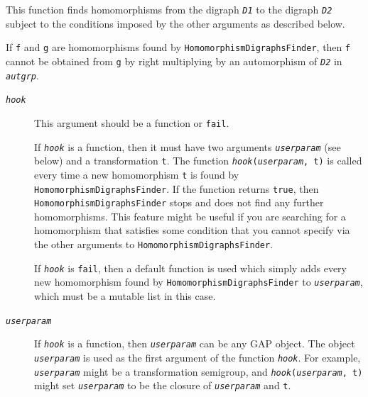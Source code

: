 \documentclass[a4paper,11pt]{report}
\begin{document}
{{{ This function finds homomorphisms from the digraph \mbox{\texttt{\mdseries\slshape D1}} to the digraph \mbox{\texttt{\mdseries\slshape D2}} subject to the conditions imposed by the other arguments as described below.

 If \texttt{f} and \texttt{g} are homomorphisms found by \texttt{HomomorphismDigraphsFinder}, then \texttt{f} cannot be obtained from \texttt{g} by right multiplying by an automorphism of \mbox{\texttt{\mdseries\slshape D2}} in \mbox{\texttt{\mdseries\slshape aut{\textunderscore}grp}}. 
\begin{description}
\item[{\mbox{\texttt{\mdseries\slshape hook}}}]  This argument should be a function or \texttt{fail}.

 If \mbox{\texttt{\mdseries\slshape hook}} is a function, then it must have two arguments \mbox{\texttt{\mdseries\slshape user{\textunderscore}param}} (see below) and a transformation \texttt{t}. The function \texttt{\mbox{\texttt{\mdseries\slshape hook}}(\mbox{\texttt{\mdseries\slshape user{\textunderscore}param}}, t)} is called every time a new homomorphism \texttt{t} is found by \texttt{HomomorphismDigraphsFinder}. If the function returns \texttt{true}, then \texttt{HomomorphismDigraphsFinder} stops and does not find any further homomorphisms. This feature might be
useful if you are searching for a homomorphism that satisfies some condition
that you cannot specify via the other arguments to \texttt{HomomorphismDigraphsFinder}. 

 If \mbox{\texttt{\mdseries\slshape hook}} is \texttt{fail}, then a default function is used which simply adds every new homomorphism
found by \texttt{HomomorphismDigraphsFinder} to \mbox{\texttt{\mdseries\slshape user{\textunderscore}param}}, which must be a mutable list in this case. 
\item[{\mbox{\texttt{\mdseries\slshape user{\textunderscore}param}}}]  If \mbox{\texttt{\mdseries\slshape hook}} is a function, then \mbox{\texttt{\mdseries\slshape user{\textunderscore}param}} can be any \textsf{GAP} object. The object \mbox{\texttt{\mdseries\slshape user{\textunderscore}param}} is used as the first argument of the function \mbox{\texttt{\mdseries\slshape hook}}. For example, \mbox{\texttt{\mdseries\slshape user{\textunderscore}param}} might be a transformation semigroup, and \texttt{\mbox{\texttt{\mdseries\slshape hook}}(\mbox{\texttt{\mdseries\slshape user{\textunderscore}param}}, t)} might set \mbox{\texttt{\mdseries\slshape user{\textunderscore}param}} to be the closure of \mbox{\texttt{\mdseries\slshape user{\textunderscore}param}} and \texttt{t}. 


\end{description}}}}
\end{document}
